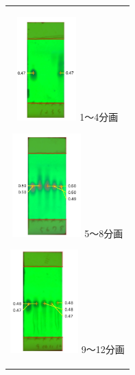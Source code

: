 \documentclass[a4paper,papersize,dvipdfmx]{jsarticle}
\begin{document}
\begin{figure}[H]
\begin{center}
\begin{tabular}{c}

\begin{minipage}{0.15\hsize}
\begin{center}
\includegraphics[clip, height=4cm]{imgs5/tlc-u1.jpg}
\hspace{1.6cm} 1〜4分画
\end{center}
\end{minipage}

\begin{minipage}{0.06\hsize}
        \hspace{2mm}
      \end{minipage}

\begin{minipage}{0.15\hsize}
\begin{center}
\includegraphics[clip, height=4cm]{imgs5/tlc-u2.jpg}
\hspace{1.6cm} 5〜8分画
\end{center}
\end{minipage}

\begin{minipage}{0.06\hsize}
        \hspace{2mm}
      \end{minipage}

\begin{minipage}{0.15\hsize}
\begin{center}
\includegraphics[clip, height=4cm]{imgs5/tlc-u3.jpg}
\hspace{1.6cm} 9〜12分画
\end{center}
\end{minipage}


\end{tabular}
\end{center}
\end{figure}
\end{document}
